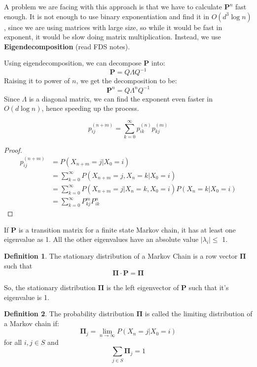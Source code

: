 \documentclass[12pt,letterpaper]{amsbook}
\theoremstyle{definition}
\newtheorem{definition}{Definition}%
\begin{document}
A problem we are facing with this approach is that we have to calculate $\mathbf{P}^{n}$ fast enough. It is not enough to use binary exponentiation and find it in $O(d^3\log{n})$, since we are using matrices with large size, so while it would be fast in exponent, it would be slow doing matrix multiplication. Instead, we use \textbf{Eigendecomposition} (read FDS notes).

Using eigendecomposition, we can decompose $\mathbf{P}$ into:
\[\mathbf{P} = Q \Lambda Q^{-1}\]
Raising it to power of $n$, we get the decomposition to be:
\[\mathbf{P}^n = Q \Lambda^n Q^{-1}\]
Since $\Lambda$ is a diagonal matrix, we can find the exponent even faster in $O(d\log n)$, hence speeding up the process.

\begin{theorem}
  \[p_{ij}^{(n+m)} = \sum_{k=0}^{\infty} p_{ik}^{(n)}p_{kj}^{(m)}\]
\end{theorem}
\begin{proof}
  \begin{align*}
    p_{ij}^{(n+m)} &= P(X_{n+m} = j | X_0 = i) \\
                   &= \sum_{k=0}^{\infty} P(X_{n+m} = j, X_n = k | X_0 = i) \\ 
                   &= \sum_{k=0}^{\infty} P(X_{n+m} = j | X_n=k, X_0 = i) P(X_n = k | X_0 =i) \\
                   &= \sum_{k=0}^{\infty} P_{kj}^m P_{ik}^n
  \end{align*}  
\end{proof}

\begin{theorem}
  If $\mathbf{P}$ is a transition matrix for a finite state Markov chain, it has at least one eigenvalue as 1.  All the other eigenvalues have an absolute value $|\lambda_i| \leq$ 1.
\end{theorem}

\begin{definition}
  The stationary distribution of a Markov Chain is a row vector $\mathbf{\Pi}$ such that 
  \[\mathbf{\Pi} \cdot \mathbf{P} = \mathbf{\Pi}\]
\end{definition}

So, the stationary distribution $\mathbf{\Pi}$ is the left eigenvector of $\mathbf{P}$ such that it's eigenvalue is 1.

\begin{definition}
  The probability distribution $\mathbf{\Pi}$ is called the limiting distribution of a Markov chain if:
  \[\mathbf{\Pi}_j = \lim_{n \rightarrow \infty} P(X_n = j | X_0 = i)\]
  for all $i,j \in S$ and 
  \[\sum_{j \in S} \mathbf{\Pi}_j = 1\]
\end{definition}
\end{document}

